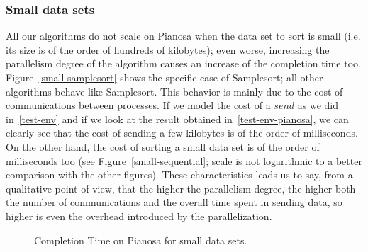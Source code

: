 \subsubsection*{Small data sets}
All our algorithms do not scale on Pianosa when the data set to sort is small (i.e. its size is of the order of hundreds of kilobytes); even worse, increasing the parallelism degree of the algorithm causes an increase of the completion time too. Figure~\ref{small-samplesort} shows the specific case of Samplesort; all other algorithms behave like Samplesort. This behavior is mainly due to the cost of communications between processes. If we model the cost of a $send$ as we did in~\ref{test-env} and if we look at the result obtained in~\ref{test-env-pianosa}, we can clearly see that the cost of sending a few kilobytes is of the order of milliseconds. On the other hand, the cost of sorting a small data set is of the order of milliseconds too (see Figure~\ref{small-sequential}; scale is not logarithmic to a better comparison with the other figures). These characteristics leads us to say, from a qualitative point of view, that the higher the parallelism degree, the higher both the number of communications and the overall time spent in sending data, so higher is even the overhead introduced by the parallelization. 

\begin{figure}[h]
	\centering
	\hspace*{20pt}
  	
  	\caption{Completion Time on Pianosa for small data sets.}
\end{figure}

